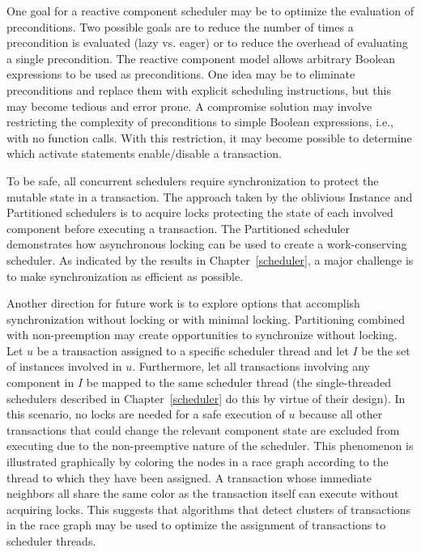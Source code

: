 One goal for a reactive component scheduler may be to optimize the evaluation of preconditions.
Two possible goals are to reduce the number of times a precondition is evaluated (lazy vs. eager) or to reduce the overhead of evaluating a single precondition.
The reactive component model allows arbitrary Boolean expressions to be used as preconditions.
One idea may be to eliminate preconditions and replace them with explicit scheduling instructions, but this may become tedious and error prone.
A compromise solution may involve restricting the complexity of preconditions to simple Boolean expressions, i.e., with no function calls.
With this restriction, it may become possible to determine which activate statements enable/disable a transaction.

To be safe, all concurrent schedulers require synchronization to protect the mutable state in a transaction.
The approach taken by the oblivious Instance and Partitioned schedulers is to acquire locks protecting the state of each involved component before executing a transaction.
The Partitioned scheduler demonstrates how asynchronous locking can be used to create a work-conserving scheduler.
As indicated by the results in Chapter~\ref{scheduler}, a major challenge is to make synchronization as efficient as possible.

Another direction for future work is to explore options that accomplish synchronization without locking or with minimal locking.
Partitioning combined with non-preemption may create opportunities to synchronize without locking.
Let $u$ be a transaction assigned to a specific scheduler thread and let $I$ be the set of instances involved in $u$.
Furthermore, let all transactions involving any component in $I$ be mapped to the same scheduler thread (the single-threaded schedulers described in Chapter~\ref{scheduler} do this by virtue of their design).
In this scenario, no locks are needed for a safe execution of $u$ because all other transactions that could change the relevant component state are excluded from executing due to the non-preemptive nature of the scheduler.
This phenomenon is illustrated graphically by coloring the nodes in a race graph according to the thread to which they have been assigned.
A transaction whose immediate neighbors all share the same color as the transaction itself can execute without acquiring locks.
This suggests that algorithms that detect clusters of transactions in the race graph may be used to optimize the assignment of transactions to scheduler threads.

